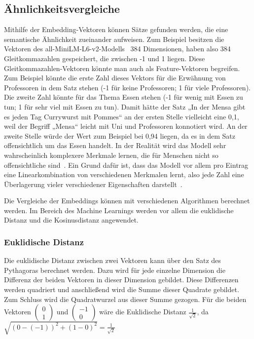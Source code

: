 \subsection{Ähnlichkeitsvergleiche}

Mithilfe der Embedding-Vektoren können Sätze gefunden werden, die eine semantische Ähnlichkeit zueinander aufweisen.
Zum Beispiel besitzen die Vektoren des all-MiniLM-L6-v2-Modells~\cite{minilm2024} 384 Dimensionen, haben also 384 Gleitkommazahlen gespeichert, die zwischen -1 und 1 liegen.
Diese Gleitkommazahlen-Vektoren könnte man auch als Feature-Vektoren begreifen.
Zum Beispiel könnte die erste Zahl dieses Vektors für die Erwähnung von Professoren in dem Satz stehen (-1 für keine Professoren; 1 für viele Professoren).
Die zweite Zahl könnte für das Thema Essen stehen (-1 für wenig mit Essen zu tun; 1 für sehr viel mit Essen zu tun).
Damit hätte der Satz „In der Mensa gibt es jeden Tag Currywurst mit Pommes“ an der ersten Stelle vielleicht eine 0,1, weil der Begriff „Mensa“ leicht mit Uni und Professoren konnotiert wird.
An der zweite Stelle würde der Wert zum Beispiel bei 0,94 liegen, da es in dem Satz offensichtlich um das Essen handelt.
In der Realität wird das Modell sehr wahrscheinlich komplexere Merkmale lernen, die für Menschen nicht so offensichtliche sind~\cite{chen2018}.
Ein Grund dafür ist, dass das Modell vor allem pro Eintrag eine Linearkombination von verschiedenen Merkmalen lernt, also jede Zahl eine Überlagerung vieler verschiedener Eigenschaften darstellt~\cite{chen2018}.

Die Vergleiche der Embeddings können mit verschiedenen Algorithmen berechnet werden.
Im Bereich des Machine Learnings werden vor allem die euklidische Distanz und die Kosinusdistanz angewendet.

\subsubsection{Euklidische Distanz}

Die euklidische Distanz zwischen zwei Vektoren kann über den Satz des Pythagoras berechnet werden. 
Dazu wird für jede einzelne Dimension die Differenz der beiden Vektoren in dieser Dimension gebildet. 
Diese Differenzen werden quadriert und anschließend wird die Summe dieser Quadrate gebildet. 
Zum Schluss wird die Quadratwurzel aus dieser Summe gezogen.
Für die beiden Vektoren
$\begin{pmatrix}0\\1\end{pmatrix}$
und
$\begin{pmatrix}-1\\0\end{pmatrix}$
wäre die Euklidische Distanz
$\frac{1}{\sqrt{2}}$, \vspace{5mm} \newline da $\sqrt{(0-(-1))^2 + (1-0)^2}=\frac{1}{\sqrt{2}}$

